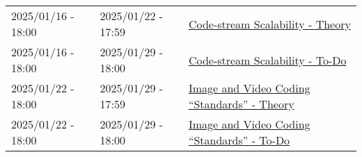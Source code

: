 \begin{tabular}{|l|l|l|}
  2025/01/16 - 18:00 & 2025/01/22 - 17:59 & \href{https://sistemas-multimedia.github.io/contents/data_scalability/}{Code-stream Scalability - Theory} \\ %
  2025/01/16 - 18:00 & 2025/01/29 - 18:00 & \href{https://sistemas-multimedia.github.io/contents/data_scalability/#x1-150008}{Code-stream Scalability - To-Do} \\
  2025/01/22 - 18:00 & 2025/01/29 - 17:59 & \href{https://sistemas-multimedia.github.io/contents/standards/}{Image and Video Coding ``Standards'' - Theory} \\ %
  2025/01/22 - 18:00 & 2025/01/29 - 18:00 & \href{https://sistemas-multimedia.github.io/contents/standards/#x1-40003/}{Image and Video Coding ``Standards'' - To-Do} \\
  \hline
\end{tabular}
 